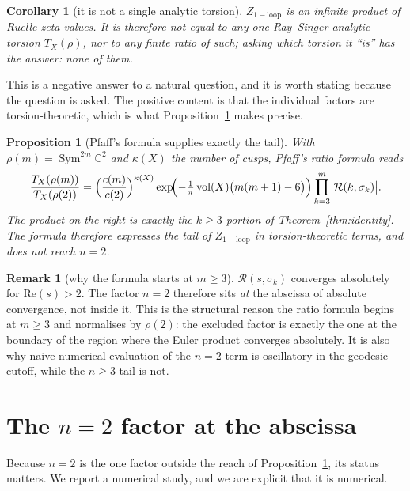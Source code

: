 \documentclass[11pt,a4paper]{article}
\newtheorem{proposition}[theorem]{Proposition}
\newtheorem{corollary}[theorem]{Corollary}
\theoremstyle{definition}
\newtheorem{remark}[theorem]{Remark}
\theoremstyle{remark}
\newcommand{\C}{\mathbb{C}}
\newcommand{\vol}{\operatorname{vol}}
\newcommand{\Sym}{\operatorname{Sym}}
\newcommand{\Rz}{\mathcal{R}}
\begin{document}
\begin{corollary}[it is not a single analytic torsion]\label{cor:notasingle}
$Z_{\mathrm{1-loop}}$ is an infinite product of Ruelle zeta values. It is therefore not equal to
any one Ray--Singer analytic torsion $T_X(\rho)$, nor to any finite ratio of such; asking which
torsion it ``is'' has the answer: none of them.
\end{corollary}

This is a negative answer to a natural question, and it is worth stating because the question is
asked. The positive content is that the individual factors are torsion-theoretic, which is what
Proposition~\ref{prop:tail} makes precise.

\begin{proposition}[Pfaff's formula supplies exactly the tail]\label{prop:tail}
With $\rho(m)=\Sym^{2m}\C^2$ and $\kappa(X)$ the number of cusps, Pfaff's ratio formula reads
\[
   \frac{T_X(\rho(m))}{T_X(\rho(2))}
   =\Bigl(\frac{c(m)}{c(2)}\Bigr)^{\kappa(X)}
     \exp\!\Bigl(-\tfrac1\pi\vol(X)\bigl(m(m+1)-6\bigr)\Bigr)
     \prod_{k=3}^{m}\bigl|\Rz(k,\sigma_k)\bigr| .
\]
The product on the right is exactly the $k\ge3$ portion of Theorem~\ref{thm:identity}. The
formula therefore expresses the tail of $Z_{\mathrm{1-loop}}$ in torsion-theoretic terms, and
does not reach $n=2$.
\end{proposition}

\begin{remark}[why the formula starts at $m\ge3$]
$\Rz(s,\sigma_k)$ converges absolutely for $\mathrm{Re}(s)>2$. The factor $n=2$ therefore sits
\emph{at} the abscissa of absolute convergence, not inside it. This is the structural reason the
ratio formula begins at $m\ge3$ and normalises by $\rho(2)$: the excluded factor is exactly the
one at the boundary of the region where the Euler product converges absolutely. It is also why
naive numerical evaluation of the $n=2$ term is oscillatory in the geodesic cutoff, while the
$n\ge3$ tail is not.
\end{remark}

\section{The $n=2$ factor at the abscissa}\label{sec:n2}

Because $n=2$ is the one factor outside the reach of Proposition~\ref{prop:tail}, its status
matters. We report a numerical study, and we are explicit that it is numerical.
\end{document}
